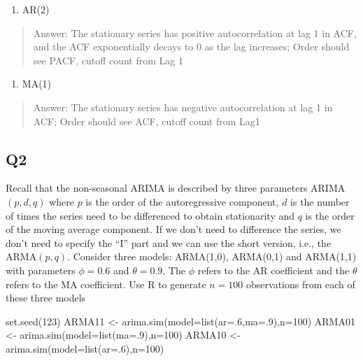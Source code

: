 \documentclass[
]{article}
\newenvironment{Shaded}{\begin{snugshade}}{\end{snugshade}}
\newcommand{\AttributeTok}[1]{\textcolor[rgb]{0.77,0.63,0.00}{#1}}
\newcommand{\DecValTok}[1]{\textcolor[rgb]{0.00,0.00,0.81}{#1}}
\newcommand{\FunctionTok}[1]{\textcolor[rgb]{0.00,0.00,0.00}{#1}}
\newcommand{\NormalTok}[1]{#1}
\newcommand{\OtherTok}[1]{\textcolor[rgb]{0.56,0.35,0.01}{#1}}
\providecommand{\tightlist}{%
  \setlength{\itemsep}{0pt}\setlength{\parskip}{0pt}}
\begin{document}
\begin{enumerate}
\def\labelenumi{(\alph{enumi})}
\tightlist
\item
  AR(2)
\end{enumerate}

\begin{quote}
Answer: The stationary series has positive autocorrelation at lag 1 in
ACF, and the ACF exponentially decays to 0 as the lag increases; Order
should see PACF, cutoff count from Lag 1
\end{quote}

\begin{enumerate}
\def\labelenumi{(\alph{enumi})}
\setcounter{enumi}{1}
\tightlist
\item
  MA(1)
\end{enumerate}

\begin{quote}
Answer: The stationary series has negative autocorrelation at lag 1 in
ACF; Order should see ACF, cutoff count from Lag1
\end{quote}

\hypertarget{q2}{%
\subsection{Q2}\label{q2}}

Recall that the non-seasonal ARIMA is described by three parameters
ARIMA\((p,d,q)\) where \(p\) is the order of the autoregressive
component, \(d\) is the number of times the series need to be
differenced to obtain stationarity and \(q\) is the order of the moving
average component. If we don't need to difference the series, we don't
need to specify the ``I'' part and we can use the short version, i.e.,
the ARMA\((p,q)\). Consider three models: ARMA(1,0), ARMA(0,1) and
ARMA(1,1) with parameters \(\phi=0.6\) and \(\theta= 0.9\). The \(\phi\)
refers to the AR coefficient and the \(\theta\) refers to the MA
coefficient. Use R to generate \(n=100\) observations from each of these
three models

\begin{Shaded}
\begin{Highlighting}[]
\FunctionTok{set.seed}\NormalTok{(}\DecValTok{123}\NormalTok{)}
\NormalTok{ARMA11 }\OtherTok{\textless{}{-}} \FunctionTok{arima.sim}\NormalTok{(}\AttributeTok{model=}\FunctionTok{list}\NormalTok{(}\AttributeTok{ar=}\NormalTok{.}\DecValTok{6}\NormalTok{,}\AttributeTok{ma=}\NormalTok{.}\DecValTok{9}\NormalTok{),}\AttributeTok{n=}\DecValTok{100}\NormalTok{)}
\NormalTok{ARMA01 }\OtherTok{\textless{}{-}} \FunctionTok{arima.sim}\NormalTok{(}\AttributeTok{model=}\FunctionTok{list}\NormalTok{(}\AttributeTok{ma=}\NormalTok{.}\DecValTok{9}\NormalTok{),}\AttributeTok{n=}\DecValTok{100}\NormalTok{)}
\NormalTok{ARMA10 }\OtherTok{\textless{}{-}} \FunctionTok{arima.sim}\NormalTok{(}\AttributeTok{model=}\FunctionTok{list}\NormalTok{(}\AttributeTok{ar=}\NormalTok{.}\DecValTok{6}\NormalTok{),}\AttributeTok{n=}\DecValTok{100}\NormalTok{)}
\end{Highlighting}
\end{Shaded}
\end{document}
